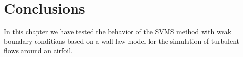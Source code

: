 %
%
%
%



\section{Conclusions}
\label{sec-C8_conclusions}
In this chapter we have tested the behavior of the SVMS method with weak boundary conditions based on a wall-law model for the simulation of turbulent flows around an airfoil. 


